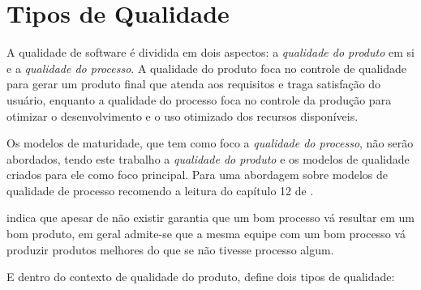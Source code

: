\documentclass[
	12pt,				%
	openright,			%
	oneside,			%
	a4paper,			%
	english,			%
	brazil,				%
	]{abntex2}
\begin{document}
\section{Tipos de Qualidade}

A qualidade de software é dividida em dois aspectos: a \emph{qualidade do produto} em si e a \emph{qualidade do processo}. A qualidade do produto foca no controle de qualidade para gerar um produto final que atenda aos requisitos e traga satisfação do usuário, enquanto a qualidade do processo foca no controle da produção para otimizar o desenvolvimento e o uso otimizado dos recursos disponíveis.

Os modelos de maturidade, que tem como foco a \emph{qualidade do processo}, não serão abordados, tendo este trabalho a \emph{qualidade do produto} e os modelos de qualidade criados para ele como foco principal. Para uma abordagem sobre modelos de qualidade de processo recomendo a leitura do capítulo 12 de .

 indica que apesar de não existir garantia que um bom processo vá resultar em um bom produto, em geral admite-se que a mesma equipe com um bom processo vá produzir produtos melhores do que se não tivesse processo algum.



E dentro do contexto de qualidade do produto,  define dois tipos de qualidade:

\label{tipos_qualidades}
\end{document}
